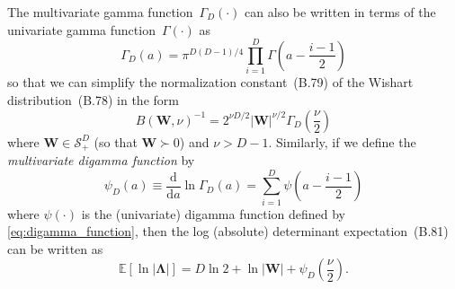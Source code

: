 \documentclass[12pt,a4paper]{article}
\begin{document}
The multivariate gamma function~$\Gamma_D (\cdot)$
can also be written in terms of the univariate gamma function~$\Gamma(\cdot)$ as
\begin{equation}
\Gamma_D (a) =
\pi^{D(D - 1)/4} \prod_{i=1}^{D} \Gamma\left(a - \frac{i - 1}{2}\right)
\label{eq:multivariate_gamma_function_in_terms_of_univariate_gamma_function}
\end{equation}
so that we can simplify the normalization constant~(B.79) of the Wishart distribution~(B.78)
in the form
\begin{equation}
B(\mathbf{W}, \nu)^{-1} =
2^{\nu D/2}
\left|\mathbf{W}\right|^{\nu/2}
\Gamma_D\left(\frac{\nu}{2}\right)
\label{eq:wishart_normalization_constant_in_terms_of_multivariate_gamma_function}
\end{equation}
where $\mathbf{W} \in \mathcal{S}_{+}^{D}$ (so that $\mathbf{W} \succ 0$) and $\nu > D - 1$.
Similarly, if we define the \emph{multivariate digamma function} by
\begin{equation}
\psi_D(a) \equiv \frac{\mathrm{d}}{\mathrm{d}a} \ln \Gamma_D (a)
= \sum_{i=1}^{D} \psi\left( a - \frac{i - 1}{2} \right)
\label{eq:multivariate_digamma_function}
\end{equation}
where $\psi(\cdot)$ is the (univariate) digamma function defined by \eqref{eq:digamma_function},
then the log (absolute) determinant expectation~(B.81) can be written as
\begin{equation}
\mathbb{E}\left[ \ln \left| \bm{\Lambda} \right| \right]
= D \ln 2 + \ln \left| \mathbf{W} \right| + \psi_D\left(\frac{\nu}{2}\right) .
\label{eq:log_determinant_expectation_of_wishart}
\end{equation}
\end{document}
